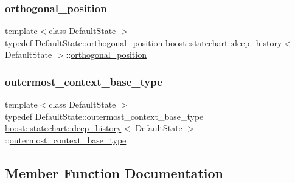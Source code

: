 \subsubsection{\texorpdfstring{orthogonal\+\_\+position}{orthogonal\_position}}
{\footnotesize\ttfamily template$<$class Default\+State $>$ \\
typedef Default\+State\+::orthogonal\+\_\+position \mbox{\hyperlink{classboost_1_1statechart_1_1deep__history}{boost\+::statechart\+::deep\+\_\+history}}$<$ Default\+State $>$\+::\mbox{\hyperlink{classboost_1_1statechart_1_1deep__history_ad0f4db179ac7777d12822e93a9023699}{orthogonal\+\_\+position}}}

\mbox{\label{classboost_1_1statechart_1_1deep__history_a2ce3a43f840db416420a3073071c22cc}} 
\subsubsection{\texorpdfstring{outermost\+\_\+context\+\_\+base\+\_\+type}{outermost\_context\_base\_type}}
{\footnotesize\ttfamily template$<$class Default\+State $>$ \\
typedef Default\+State\+::outermost\+\_\+context\+\_\+base\+\_\+type \mbox{\hyperlink{classboost_1_1statechart_1_1deep__history}{boost\+::statechart\+::deep\+\_\+history}}$<$ Default\+State $>$\+::\mbox{\hyperlink{classboost_1_1statechart_1_1deep__history_a2ce3a43f840db416420a3073071c22cc}{outermost\+\_\+context\+\_\+base\+\_\+type}}}



\subsection{Member Function Documentation}
\mbox{\label{classboost_1_1statechart_1_1deep__history_aae02393ac5f3ab2377e4d1c39ab5bc78}} 
